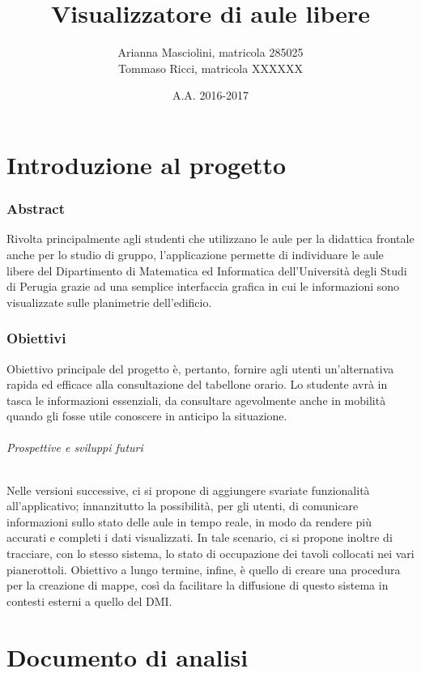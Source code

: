 \documentclass{article}
\title{{\huge Visualizzatore di aule libere}}
\author{Arianna Masciolini, matricola 285025\\ Tommaso Ricci, matricola XXXXXX}
\date{A.A. 2016-2017}
\begin{document}
	\maketitle
	\newpage
	\tableofcontents
	\newpage
	\part{Introduzione al progetto}
	\section{Abstract}
	Rivolta principalmente agli studenti che utilizzano le aule per la didattica frontale anche per lo studio di gruppo, l'applicazione permette di individuare le aule libere del Dipartimento di Matematica ed Informatica dell'Università degli Studi di Perugia grazie ad una semplice interfaccia grafica in cui le informazioni sono visualizzate sulle planimetrie dell'edificio.
	\section{Obiettivi}
	Obiettivo principale del progetto è, pertanto, fornire agli utenti un'alternativa rapida ed efficace alla consultazione del tabellone orario. Lo studente avrà in tasca le informazioni essenziali, da consultare agevolmente anche in mobilità quando gli fosse utile conoscere in anticipo la situazione.
	\paragraph{Prospettive e sviluppi futuri}
	Nelle versioni successive, ci si propone di aggiungere svariate funzionalità all'applicativo; innanzitutto la possibilità, per gli utenti, di comunicare informazioni sullo stato delle aule in tempo reale, in modo da rendere più accurati e completi i dati visualizzati. In tale scenario, ci si propone inoltre di tracciare, con lo stesso sistema, lo stato di occupazione dei tavoli collocati nei vari pianerottoli. Obiettivo a lungo termine, infine, è quello di creare una procedura per la creazione di mappe, così da facilitare la diffusione di questo sistema in contesti esterni a quello del DMI.
	\newpage
	\part{Documento di analisi}
\end{document}
